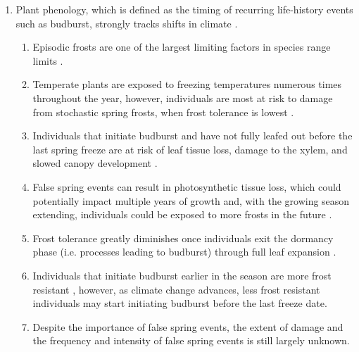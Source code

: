 \documentclass{article}\usepackage[]{graphicx}\usepackage[]{color}
\begin{document}
\begin{enumerate}
\item Plant phenology, which is defined as the timing of recurring life-history events such as budburst, strongly tracks shifts in climate \citep{Cleland2007, Wolkovich2012}.
\begin{enumerate}
\item Episodic frosts are one of the largest limiting factors in species range limits \citep{Kollas2014}.
\item Temperate plants are exposed to freezing temperatures numerous times throughout the year, however, individuals are most at risk to damage from stochastic spring frosts, when frost tolerance is lowest \citep{Sakai1987}.
\item Individuals that initiate budburst and have not fully leafed out before the last spring freeze are at risk of leaf tissue loss, damage to the xylem, and slowed canopy development \citep{Gu2008, Hufkens2012}.
\item False spring events can result in photosynthetic tissue loss, which could potentially impact multiple years of growth and, with the growing season extending, individuals could be exposed to more frosts in the future \citep{Liu2018}.
\item Frost tolerance greatly diminishes once individuals exit the dormancy phase (i.e. processes leading to budburst) through full leaf expansion \citep{Vitasse2014, Lenz2016}.
\item Individuals that initiate budburst earlier in the season are more frost resistant \citep{Korner2016}, however, as climate change advances, less frost resistant individuals may start initiating budburst before the last freeze date.
\item Despite the importance of false spring events, the extent of damage and the frequency and intensity of false spring events is still largely unknown.
\end{enumerate}




\end{enumerate}
\end{document}
